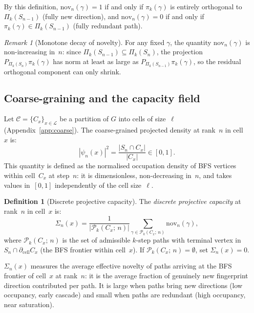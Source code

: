 \documentclass[11pt,a4paper]{article}
\theoremstyle{definition}
\newtheorem{definition}[theorem]{Definition}
\theoremstyle{remark}
\newtheorem{remark}[theorem]{Remark}
\newcommand{\Pik}{\Pi_k}
\newcommand{\nov}{\mathrm{nov}}
\newcommand{\Pk}{\mathcal{P}_k}
\begin{document}
    By this definition, $\nov_n(\gamma) = 1$ if and only if $\pi_k(\gamma)$ is entirely orthogonal
    to $\Pik(S_{n-1})$ (fully new direction), and $\nov_n(\gamma) = 0$ if and only if
    $\pi_k(\gamma) \in \Pik(S_{n-1})$ (fully redundant path).

    \begin{remark}[Monotone decay of novelty]
      \label{rem:monotone}
      For any fixed $\gamma$, the quantity $\nov_n(\gamma)$ is non-increasing in~$n$:
      since $\Pik(S_{n-1}) \subseteq \Pik(S_n)$, the projection $P_{\Pik(S_n)}\pi_k(\gamma)$ has
      norm at least as large as $P_{\Pik(S_{n-1})}\pi_k(\gamma)$,
      so the residual orthogonal component can only shrink.
    \end{remark}

  \subsection{Coarse-graining and the capacity field}
    \label{ssec:coarsegrain}

    Let $\mathcal{C} = \{C_x\}_{x\in\mathcal{L}}$ be a partition of $G$ into cells of size~$\ell$
    (Appendix~\ref{app:coarse}).
    The coarse-grained projected density at rank~$n$ in cell~$x$ is:
    \begin{equation}
      \label{eq:psi-density}
      |\psi_n(x)|^2 = \frac{|S_n \cap C_x|}{|C_x|} \in [0,1].
    \end{equation}
    This quantity is defined as the normalised occupation density of BFS vertices within
    cell~$C_x$ at step~$n$: it is dimensionless, non-decreasing in~$n$, and takes values
    in~$[0,1]$ independently of the cell size~$\ell$.

    \begin{definition}[Discrete projective capacity]
      \label{def:Sigma}
      The \emph{discrete projective capacity} at rank~$n$ in cell~$x$ is:
      \begin{equation}
        \label{eq:Sigma}
        \Sigma_n(x)
        = \frac{1}{|\Pk(C_x;\,n)|}
        \sum_{\gamma \in \Pk(C_x;\,n)} \nov_n(\gamma),
      \end{equation}
      where $\Pk(C_x;\,n)$ is the set of admissible $k$-step paths with terminal vertex in
      $S_n \cap \partial_{\mathrm{cell}} C_x$ (the BFS frontier within cell~$x$).
      If $\Pk(C_x;\,n) = \emptyset$, set $\Sigma_n(x) = 0$.
    \end{definition}

    $\Sigma_n(x)$ measures the average effective novelty of paths arriving at the BFS frontier
    of cell~$x$ at rank~$n$: it is the average fraction of genuinely new fingerprint direction
    contributed per path.
    It is large when paths bring new directions (low occupancy, early cascade) and small
    when paths are redundant (high occupancy, near saturation).
\end{document}
